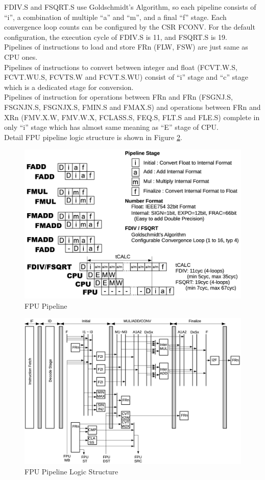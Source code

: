 FDIV.S and FSQRT.S use Goldschmidt's Algorithm, so each pipeline consists of “i”, a combination of multiple “a” and “m”, and a final “f” stage. Each convergence loop counts can be configured by the CSR FCONV. For the default configuration, the execution cycle of FDIV.S is 11, and FSQRT.S is 19.\\

Pipelines of instructions to load and store FRn (FLW, FSW) are just same as CPU ones.\\
Pipelines of instructions to convert between integer and float (FCVT.W.S, FCVT.WU.S, FCVTS.W and FCVT.S.WU) consist of “i” stage and “c” stage which is a dedicated stage for conversion.\\
Pipelines of instruction for operations between FRn and FRn (FSGNJ.S, FSGNJN.S, FSGNJX.S, FMIN.S and FMAX.S) and operations between FRn and XRn (FMV.X.W, FMV.W.X, FCLASS.S, FEQ.S, FLT.S and FLE.S) complete in only “i” stage which has almost same meaning as “E” stage of CPU.\\

Detail FPU pipeline logic structure is shown in Figure \ref{fig:FPUPipelineLogicStructure}.\\

\begin{figure}[H]
    \includegraphics[width=1.00\columnwidth]{./Figure/FPUPipeline.png}
    \caption{FPU Pipeline}
    \label{fig:FPUPipeline}
\end{figure}

\begin{figure}[H]
    \includegraphics[width=1.00\columnwidth]{./Figure/FPUPipelineLogicStructure.png}
    \caption{FPU Pipeline Logic Structure}
    \label{fig:FPUPipelineLogicStructure}
\end{figure}



